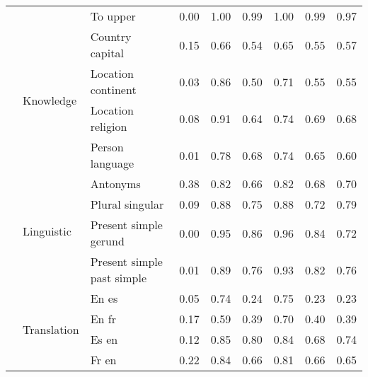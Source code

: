 \begin{center}
\begin{longtable}{lllrrrrrr}
 &  & To upper & 0.00 & 1.00 & 0.99 & 1.00 & 0.99 & 0.97 \\
\cline{2-9}
 & \multirow[t]{4}{*}{Knowledge} & Country capital & 0.15 & 0.66 & 0.54 & 0.65 & 0.55 & 0.57 \\
 &  & Location continent & 0.03 & 0.86 & 0.50 & 0.71 & 0.55 & 0.55 \\
 &  & Location religion & 0.08 & 0.91 & 0.64 & 0.74 & 0.69 & 0.68 \\
 &  & Person language & 0.01 & 0.78 & 0.68 & 0.74 & 0.65 & 0.60 \\
\cline{2-9}
 & \multirow[t]{4}{*}{Linguistic} & Antonyms & 0.38 & 0.82 & 0.66 & 0.82 & 0.68 & 0.70 \\
 &  & Plural singular & 0.09 & 0.88 & 0.75 & 0.88 & 0.72 & 0.79 \\
 &  & Present simple gerund & 0.00 & 0.95 & 0.86 & 0.96 & 0.84 & 0.72 \\
 &  & Present simple past simple & 0.01 & 0.89 & 0.76 & 0.93 & 0.82 & 0.76 \\
\cline{2-9}
 & \multirow[t]{4}{*}{Translation} & En es & 0.05 & 0.74 & 0.24 & 0.75 & 0.23 & 0.23 \\
 &  & En fr & 0.17 & 0.59 & 0.39 & 0.70 & 0.40 & 0.39 \\
 &  & Es en & 0.12 & 0.85 & 0.80 & 0.84 & 0.68 & 0.74 \\
 &  & Fr en & 0.22 & 0.84 & 0.66 & 0.81 & 0.66 & 0.65 \\
\cline{1-9} \cline{2-9}
\bottomrule
\end{longtable}

\end{center}
\twocolumn
